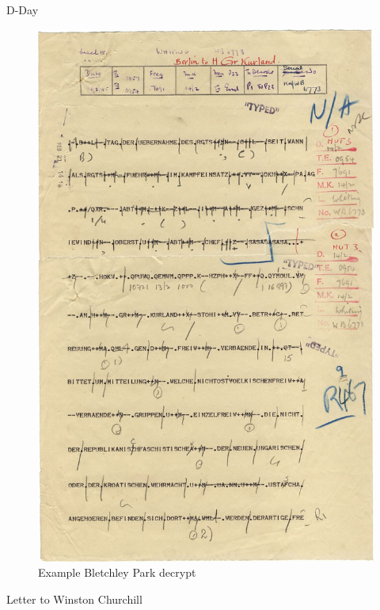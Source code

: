 \documentclass[hyphens,aspectratio=169]{beamer}
\begin{document}
\begin{frame}[fragile]{D-Day}
	\begin{center}
		\begin{figure}
			\includegraphics[scale=0.105]{paper/images/bletchley_decrypt.jpg}
			\small
			\caption{Example Bletchley Park decrypt}
		\end{figure}

	\end{center}
\end{frame}

\begin{frame}[fragile]{Letter to Winston Churchill}
\end{frame}
\end{document}
